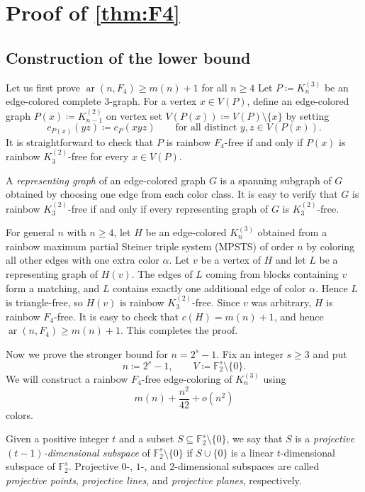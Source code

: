 \documentclass[10pt,a4paper]{article}
\theoremstyle{definition}
\newcommand{\FF}{\mathbb{F}}
\DeclareMathOperator{\ar}{ar}
\begin{document}
\section{Proof of \cref{thm:F4}}\label{sec: proof of 3}
\subsection{Construction of the lower bound}

Let us first prove $\ar(n,F_4)\ge m(n)+1$ for all $n\ge4$
Let $P\coloneqq K_n^{(3)}$ be an edge-colored complete $3$-graph.
For a vertex $x\in V(P)$, define an edge-colored graph $P(x)\coloneqq K_{n-1}^{(2)}$ on vertex set
$V(P(x))\coloneqq V(P)\setminus\{x\}$ by setting
\[
    c_{P(x)}(yz)\coloneqq c_P(xyz)\qquad\text{for all distinct }y,z\in V(P(x)).
\]
It is straightforward to check that $P$ is rainbow $F_4$-free if and only if $P(x)$ is rainbow $K_3^{(2)}$-free for every $x\in V(P)$.

A {\it representing graph} of an edge-colored graph $G$ is a spanning subgraph of $G$ obtained by choosing one edge from each color class.
It is easy to verify that $G$ is rainbow $K_3^{(2)}$-free if and only if every representing graph of $G$ is $K_3^{(2)}$-free.

For general $n$ with $n\ge4$, let $H$ be an edge-colored $K_n^{(3)}$ obtained from a rainbow maximum partial Steiner triple system (MPSTS) of order $n$ by coloring all other edges with one extra color $\alpha$.
Let $v$ be a vertex of $H$ and let $L$ be a representing graph of $H(v)$.
The edges of $L$ coming from blocks containing $v$ form a matching, and $L$ contains exactly one additional edge of color $\alpha$.
Hence $L$ is triangle-free, so $H(v)$ is rainbow $K_3^{(2)}$-free.
Since $v$ was arbitrary, $H$ is rainbow $F_4$-free.
It is easy to check that $c(H)=m(n)+1$, and hence $\ar(n,F_4)\ge m(n)+1$.
This completes the proof.


\bigskip

Now we prove the stronger bound for $n=2^s-1$.
Fix an integer $s\ge3$ and put
\[
    n\coloneqq 2^s-1,\qquad V\coloneqq \FF_2^s\setminus\{0\}.
\]
We will construct a rainbow $F_4$-free edge-coloring of $K_n^{(3)}$ using
\[
    m(n)+\frac{n^2}{42}+o(n^2)
\]
colors.


Given a positive integer $t$ and a subset $S\subseteq \FF_2^s\setminus\{0\}$, we say that $S$ is a {\it projective $(t-1)$-dimensional subspace} of $\FF_2^s\setminus\{0\}$ if $S\cup\{0\}$ is a linear $t$-dimensional subspace of $\FF_2^s$.
Projective $0$-, $1$-, and $2$-dimensional subspaces are called {\it projective points}, {\it projective lines}, and {\it projective planes}, respectively.
\end{document}
